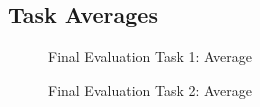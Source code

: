 \subsection*{Task Averages}
\begin{figure}[!h]
  \centering
  \begin{minipage}[b]{0.47\textwidth}
    \caption{Final Evaluation Task 1: Average}
  \end{minipage}
  \hfill
  \begin{minipage}[b]{0.47\textwidth}
  \caption{Final Evaluation Task 2: Average}
  \end{minipage}
\end{figure}
